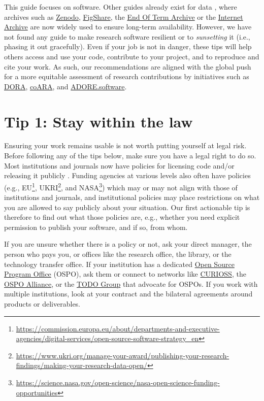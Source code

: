 \documentclass[10pt,letterpaper]{article}
\begin{document}
This guide focuses on software.
Other guides already exist for data \cite{Perkel2023},
where archives such as \href{https://zenodo.org/}{Zenodo},
\href{https://figshare.com/}{FigShare},
the \href{https://eotarchive.org/}{End Of Term Archive}
or the \href{http://archive.org/}{Internet Archive}
are now widely used to ensure long-term availability.
However,
we have not found any guide to make research software resilient
or to \emph{sunsetting} it (i.e., phasing it out gracefully).
Even if your job is not in danger,
these tips will help others access and use your code,
contribute to your project,
and to reproduce and cite your work.
As such,
our recommendations
are aligned with the global push for a more equitable assessment of research contributions
by initiatives such as \href{https://sfdora.org/}{DORA},
\href{https://coara.eu/}{coARA},
and \href{https://adore.software/}{ADORE.software}.

\section*{Tip 1: Stay within the law}

Ensuring your work remains usable is not worth putting yourself at legal risk.
Before following any of the tips below,
make sure you have a legal right to do so.
Most institutions and journals now have policies for licensing code and/or releasing it publicly \cite{Katz2018,Ham2019}.
Funding agencies at various levels also often have policies
(e.g.,
EU\footnote{\url{https://commission.europa.eu/about/departments-and-executive-agencies/digital-services/open-source-software-strategy_en}},
UKRI\footnote{\url{https://www.ukri.org/manage-your-award/publishing-your-research-findings/making-your-research-data-open/}},
and NASA\footnote{\url{https://science.nasa.gov/open-science/nasa-open-science-funding-opportunities}})
which may or may not align with those of institutions and journals,
and institutional policies may place restrictions on what you are allowed to say publicly about your situation.
Our first actionable tip is therefore to find out what those policies are,
e.g.,
whether you need explicit permission to publish your software,
and if so,
from whom.

If you are unsure whether there is a policy or not,
ask your direct manager,
the person who pays you,
or offices like the research office,
the library,
or the technology transfer office.
If your institution has a dedicated
\href{https://sustainoss.org/academic-map/universities/index.html}{Open Source Program Office} (OSPO),
ask them
or connect to networks like \href{https://curioss.org}{CURIOSS},
the \href{https://ospo-alliance.org/}{OSPO Alliance},
or the \href{https://todogroup.org/}{TODO Group}
that advocate for OSPOs.
If you work with multiple institutions,
look at your contract and the bilateral agreements around products or deliverables.
\end{document}
